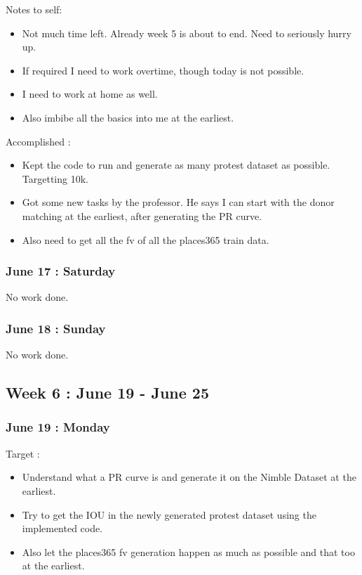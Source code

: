 \documentclass{article}
\begin{document}
Notes to self:
\begin{itemize}
\item Not much time left. Already week 5 is about to end. Need to seriously hurry up.
\item If required I need to work overtime, though today is not possible.
\item I need to work at home as well.
\item Also imbibe all the basics into me at the earliest.
\end{itemize}

Accomplished :
\begin{itemize}
\item Kept the code to run and generate as many protest dataset as possible. Targetting 10k.
\item Got some new tasks by the professor. He says I can start with the donor matching at the earliest, after generating the PR curve.
\item Also need to get all the fv of all the places365 train data.
\end{itemize}

\subsubsection{June 17 : Saturday}
No work done.

\subsubsection{June 18 : Sunday}
No work done.

\subsection{Week 6 : June 19 - June 25}
\subsubsection{June 19 : Monday}
Target :
\begin{itemize}
\item Understand what a PR curve is and generate it on the Nimble Dataset at the earliest.
\item Try to get the IOU in the newly generated protest dataset using the implemented code.
\item Also let the places365 fv generation happen as much as possible and that too at the earliest.
\end{itemize}
\end{document}
